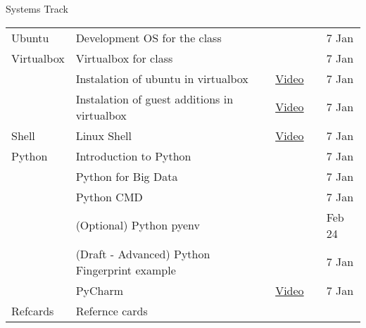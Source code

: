 \begin{threeparttable}
\capstart\caption{Systems Track}\label{\detokenize{i524/lectures:id65}}
\noindent\begin{tabulary}{\linewidth}{|L|L|L|L|L|}
\hline
{}\relax &\relax &\relax &\relax &\relax \\
\hline
Ubuntu
&
Development OS for the class
&
{\hyperref[\detokenize{lesson/linux/ubuntu::doc}]{}}
&&
7 Jan
\\
\hline
Virtualbox
&
Virtualbox for class
&
{\hyperref[\detokenize{lesson/linux/virtualbox::doc}]{}}
&&
7 Jan
\\
\hline&
Instalation of ubuntu in virtualbox
&
\href{https://youtu.be/NWibDntN2M4}{Video}
&&
7 Jan
\\
\hline&
Instalation of guest additions in virtualbox
&
\href{https://youtu.be/wdCoiNdn2jA}{Video}
&&
7 Jan
\\
\hline
Shell
&
Linux Shell
&
\href{https://www.youtube.com/watch?v=LeTlm\_ck2GI}{Video} \textbar{} {\hyperref[\detokenize{lesson/linux/linux::doc}]{}}
&&
7 Jan
\\
\hline
Python
&
Introduction to Python
&
{\hyperref[\detokenize{lesson/prg/python_intro::doc}]{}}
&&
7 Jan
\\
\hline&
Python for Big Data
&
{\hyperref[\detokenize{lesson/prg/python_big_data::doc}]{}}
&&
7 Jan
\\
\hline&
Python CMD
&
{\hyperref[\detokenize{lesson/prg/python_cmd::doc}]{}}
&&
7 Jan
\\
\hline&
(Optional) Python pyenv
&
{\hyperref[\detokenize{lesson/prg/pyenv::doc}]{}}
&&
Feb 24
\\
\hline&
(Draft - Advanced) Python Fingerprint example
&
{\hyperref[\detokenize{lesson/prg/python_lesson1::doc}]{}}
&&
7 Jan
\\
\hline&
PyCharm
&
\href{https://www.youtube.com/watch?v=X8ZpbZweJcw}{Video}
&&
7 Jan
\\
\hline
Refcards
&
Refernce cards
&
{\hyperref[\detokenize{lesson/linux/refcards::doc}]{}}

\end{tabulary}
\end{threeparttable}
